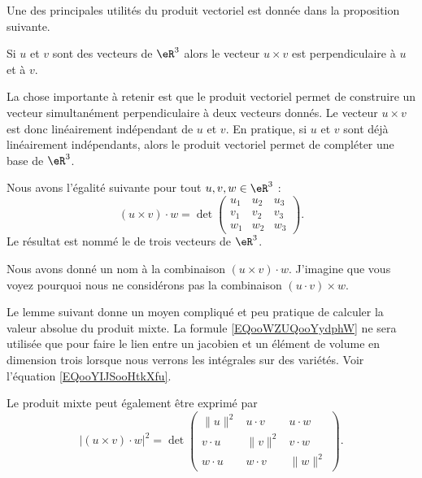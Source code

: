 Une des principales utilités du produit vectoriel est donnée dans la proposition suivante.
\begin{proposition}     \label{PROPooIQMTooFHNjfu}
    Si \( u\) et \( v\) sont des vecteurs de \( \eR^3\) alors le vecteur \( u\times v\) est perpendiculaire à \( u\) et à \( v\).
\end{proposition}
La chose importante à retenir est que le produit vectoriel permet de construire un vecteur simultanément perpendiculaire à deux vecteurs donnés. Le vecteur $u\times v$ est donc linéairement indépendant de $u$ et $v$. En pratique, si $u$ et $v$ sont déjà linéairement indépendants, alors le produit vectoriel permet de compléter une base de $\eR^3$.

\begin{lemmaDef}
    Nous avons l'égalité suivante pour tout \( u,v,w\in \eR^3\) :
    \begin{equation}        \label{EQooKJYUooSQgfXU}
        (u\times v)\cdot w=\det\begin{pmatrix}
                u_1	&	u_2	&	u_3	\\
                v_1	&	v_2	&	v_3	\\
                w_1	&	w_2	&	w_3
        \end{pmatrix}.
    \end{equation}
    Le résultat est nommé le  de trois vecteurs de \( \eR^3\).
\end{lemmaDef}

\begin{normaltext}
    Nous avons donné un nom à la combinaison \( (u\times v)\cdot w\). J'imagine que vous voyez pourquoi nous ne considérons pas la combinaison $(u\cdot v)\times w$.
\end{normaltext}

Le lemme suivant donne un moyen compliqué et peu pratique de calculer la valeur absolue du produit mixte. La formule \eqref{EQooWZUQooYydphW} ne sera utilisée que pour faire le lien entre un jacobien et un élément de volume en dimension trois lorsque nous verrons les intégrales sur des variétés. Voir l'équation \eqref{EQooYIJSooHtkXfu}. 

\begin{lemma}        \label{LEMooSMWNooCmEZeY}
    Le produit mixte peut également être exprimé par
    \begin{equation}        \label{EQooWZUQooYydphW}
           |(u\times v)\cdot w|^2=\det\begin{pmatrix}
            \| u \|^2    &   u\cdot v    &   u\cdot w    \\
            v\cdot u    &   \| v \|^2    &   v\cdot w    \\
            w\cdot u    &   w\cdot v    &   \| w \|^2
        \end{pmatrix}.
    \end{equation}
\end{lemma}

